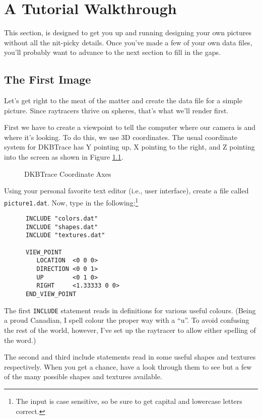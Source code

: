\chapter{A Tutorial Walkthrough}

This section, is designed to get you up and running designing your own
pictures without all the nit-picky details.  Once you've made a few
of your own data files, you'll probably want to advance to the next
section to fill in the gaps.

\section{The First Image}

Let's get right to the meat of the matter and create the data file for a
simple picture.  Since raytracers thrive on spheres, that's what we'll render
first.

First we have to create a viewpoint to tell the computer where our camera is
and where it's looking.  To do this, we use 3D coordinates.  The usual
coordinate system
for DKBTrace has Y pointing up, X pointing to the right, and
Z pointing into the screen as shown in Figure \ref{axes}.

\begin{figure}[htbp]
\begin{centering}

\caption{DKBTrace Coordinate Axes}
\label{axes}
\end{centering}
\end{figure}

Using your personal favorite text editor (i.e., user interface),
create a file called {\tt picture1.dat}.  Now, type in the
following:\footnote{The input is case sensitive, so be sure to
get capital and lowercase letters correct.}
\begin{verbatim}
      INCLUDE "colors.dat"
      INCLUDE "shapes.dat"
      INCLUDE "textures.dat"

      VIEW_POINT
         LOCATION  <0 0 0>
         DIRECTION <0 0 1>
         UP        <0 1 0>
         RIGHT     <1.33333 0 0>
      END_VIEW_POINT
\end{verbatim}
The first {\tt INCLUDE}
statement reads in definitions for various
useful colours.  (Being a proud Canadian, I spell colour the proper
way with a ``u''.  To avoid confusing the rest of the world, however,
I've set up the raytracer to allow either spelling of the word.)

The second and third include statements read in some useful shapes and textures
respectively.  When you get a chance, have a look through them to see
but a few of the many possible shapes and textures available.

